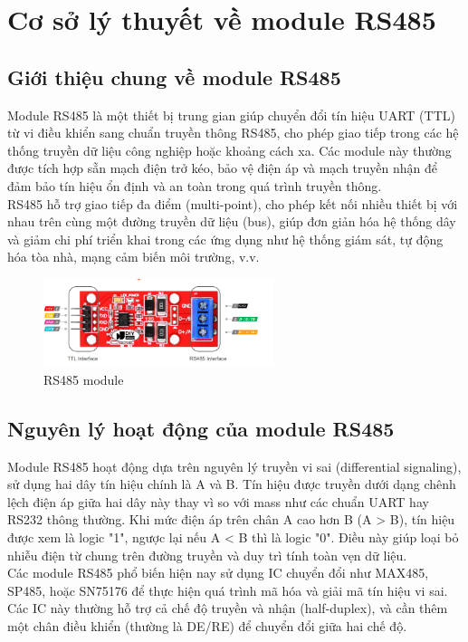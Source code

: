\section{Cơ sở lý thuyết về module RS485}
\subsection{Giới thiệu chung về module RS485} 
\tab Module RS485 là một thiết bị trung gian giúp chuyển đổi tín hiệu UART (TTL) từ vi điều khiển sang chuẩn truyền thông RS485, cho phép giao tiếp trong các hệ thống truyền dữ liệu công nghiệp hoặc khoảng cách xa. Các module này thường được tích hợp sẵn mạch điện trở kéo, bảo vệ điện áp và mạch truyền nhận để đảm bảo tín hiệu ổn định và an toàn trong quá trình truyền thông.\\
\tab RS485 hỗ trợ giao tiếp đa điểm (multi-point), cho phép kết nối nhiều thiết bị với nhau trên cùng một đường truyền dữ liệu (bus), giúp đơn giản hóa hệ thống dây và giảm chi phí triển khai trong các ứng dụng như hệ thống giám sát, tự động hóa tòa nhà, mạng cảm biến môi trường, v.v.
\begin{figure}[H]
  \centering
  \includegraphics[width=0.6\textwidth]{Images/RS485.png}
  \caption{RS485 module}
\end{figure}
\subsection{Nguyên lý hoạt động của module RS485} 
\tab Module RS485 hoạt động dựa trên nguyên lý truyền vi sai (differential signaling), sử dụng hai dây tín hiệu chính là A và B. Tín hiệu được truyền dưới dạng chênh lệch điện áp giữa hai dây này thay vì so với mass như các chuẩn UART hay RS232 thông thường. Khi mức điện áp trên chân A cao hơn B (A > B), tín hiệu được xem là logic "1", ngược lại nếu A < B thì là logic "0". Điều này giúp loại bỏ nhiễu điện từ chung trên đường truyền và duy trì tính toàn vẹn dữ liệu.\\
\tab Các module RS485 phổ biến hiện nay sử dụng IC chuyển đổi như MAX485, SP485, hoặc SN75176 để thực hiện quá trình mã hóa và giải mã tín hiệu vi sai. Các IC này thường hỗ trợ cả chế độ truyền và nhận (half-duplex), và cần thêm một chân điều khiển (thường là DE/RE) để chuyển đổi giữa hai chế độ.

